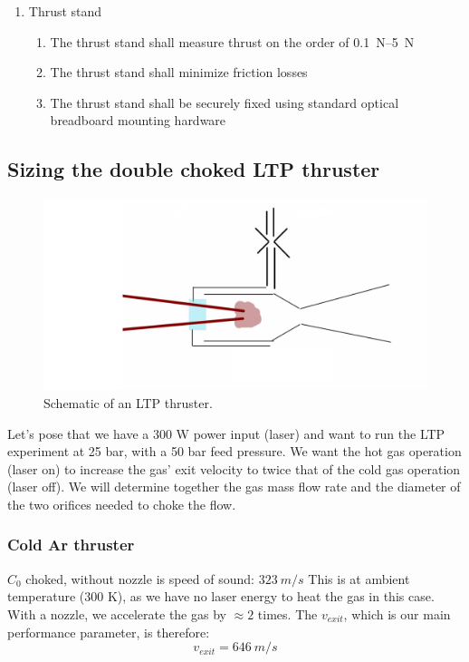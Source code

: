 \begin{enumerate}
\begin{enumerate}
                \end{enumerate}
                \item Thrust stand
                \begin{enumerate}
                    \item The thrust stand shall measure thrust on the order of \qtyrange{0.1}{5}{N}
                    \item The thrust stand shall minimize friction losses
                    \item The thrust stand shall be securely fixed using standard optical breadboard mounting hardware
                \end{enumerate}
            \end{enumerate}


        \subsection{Sizing the double choked LTP thruster}

            \begin{figure}[h]
            \centering
            \includegraphics[width=0.8\linewidth]{assets/3 design/double choked sizing.png}
            \caption{\label{fig:frog}Schematic of an LTP thruster.}
            \end{figure}
            
            Let's pose that we have a 300 W power input (laser) and want to run the LTP experiment at 25 bar, with a 50 bar feed pressure. We want the hot gas operation (laser on) to increase the gas' exit velocity to twice that of the cold gas operation (laser off). We will determine together the gas mass flow rate and the diameter of the two orifices needed to choke the flow.
            
            \subsubsection{Cold Ar thruster}
            $C_0$ choked, without nozzle is speed of sound: $323 \:m/s$ This is at ambient temperature (300 K), as we have no laser energy to heat the gas in this case. With a nozzle, we accelerate the gas by $\approx 2$ times. The $v_{exit}$, which is our main performance parameter, is therefore: 
            \[v_{exit} = 646\: m/s\]
            
